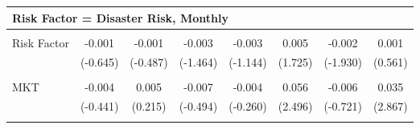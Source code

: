 \begin{tabular}{lccccccc}
\multicolumn{7}{l}{\textbf{Risk Factor = Disaster Risk, Monthly}} \\ 
\hline \\[-1.8ex] 
Risk Factor & -0.001  & -0.001 & -0.003 & -0.003  & 0.005 & -0.002 & 0.001  \\ 
 & (-0.645) & (-0.487) & (-1.464) & (-1.144) & (1.725) & (-1.930) & (0.561) \\ \\[-1.8ex] 
MKT & -0.004  & 0.005 & -0.007 & -0.004  & 0.056 & -0.006 & 0.035  \\ 
 & (-0.441) & (0.215) & (-0.494) & (-0.260) & (2.496) & (-0.721) & (2.867) \\ \\[-1.8ex] 
\bottomrule 
\end{tabular}